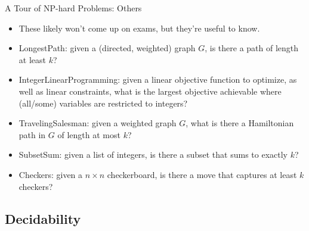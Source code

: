 \documentclass{beamer}
\begin{document}
\begin{frame}[t]{A Tour of NP-hard Problems: Others}
    \begin{itemize}
        \item These likely won't come up on exams, but they're useful to know.
        \item \pause \alert{LongestPath}: given a (directed, weighted) graph $G$, is there a path of length at least $k$?
        \item \pause \alert{IntegerLinearProgramming}: given a linear objective function to optimize, as well as linear constraints, what is the largest objective achievable where (all/some) variables are restricted to integers?
        \item \pause \alert{TravelingSalesman}: given a weighted graph $G$, what is there a Hamiltonian path in $G$ of length at most $k$?
        \item \pause \alert{SubsetSum}: given a list of integers, is there a subset that sums to exactly $k$?
        \item \pause \alert{Checkers}: given a $n \times n$ checkerboard, is there a move that captures at least $k$ checkers?
    \end{itemize}
\end{frame}

\subsection{Decidability}
\end{document}
